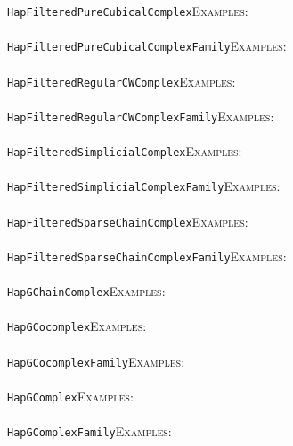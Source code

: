 \documentclass[a4paper,11pt]{report}
\begin{document}
{{ \texttt{HapFilteredPureCubicalComplex}{\nobreakspace}{\nobreakspace}{\nobreakspace}{\nobreakspace}\textsc{Examples:} \\
 \\
 \texttt{HapFilteredPureCubicalComplexFamily}{\nobreakspace}{\nobreakspace}{\nobreakspace}{\nobreakspace}\textsc{Examples:} \\
 \\
 \texttt{HapFilteredRegularCWComplex}{\nobreakspace}{\nobreakspace}{\nobreakspace}{\nobreakspace}\textsc{Examples:} \\
 \\
 \texttt{HapFilteredRegularCWComplexFamily}{\nobreakspace}{\nobreakspace}{\nobreakspace}{\nobreakspace}\textsc{Examples:} \\
 \\
 \texttt{HapFilteredSimplicialComplex}{\nobreakspace}{\nobreakspace}{\nobreakspace}{\nobreakspace}\textsc{Examples:} \\
 \\
 \texttt{HapFilteredSimplicialComplexFamily}{\nobreakspace}{\nobreakspace}{\nobreakspace}{\nobreakspace}\textsc{Examples:} \\
 \\
 \texttt{HapFilteredSparseChainComplex}{\nobreakspace}{\nobreakspace}{\nobreakspace}{\nobreakspace}\textsc{Examples:} \\
 \\
 \texttt{HapFilteredSparseChainComplexFamily}{\nobreakspace}{\nobreakspace}{\nobreakspace}{\nobreakspace}\textsc{Examples:} \\
 \\
 \texttt{HapGChainComplex}{\nobreakspace}{\nobreakspace}{\nobreakspace}{\nobreakspace}\textsc{Examples:} \\
 \\
 \texttt{HapGCocomplex}{\nobreakspace}{\nobreakspace}{\nobreakspace}{\nobreakspace}\textsc{Examples:} \\
 \\
 \texttt{HapGCocomplexFamily}{\nobreakspace}{\nobreakspace}{\nobreakspace}{\nobreakspace}\textsc{Examples:} \\
 \\
 \texttt{HapGComplex}{\nobreakspace}{\nobreakspace}{\nobreakspace}{\nobreakspace}\textsc{Examples:} \\
 \\
 \texttt{HapGComplexFamily}{\nobreakspace}{\nobreakspace}{\nobreakspace}{\nobreakspace}\textsc{Examples:} \\
 \\
}}
\end{document}
